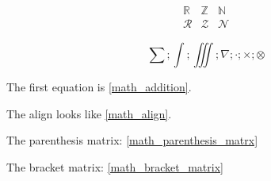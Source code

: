 \begin{equation}
    \begin{array}{ccc}
        \mathbb{R} &\mathbb{Z} &\mathbb{N}\\
        \mathcal{R} &\mathcal{Z} &\mathcal{N}
    \end{array}
\end{equation}

\begin{equation}
    \sum; \int; \iiint; \nabla; \cdot; \times; \otimes
\end{equation}


The first equation is \eqref{math_addition}.


The align looks like \eqref{math_align}.


The parenthesis matrix: \eqref{math_parenthesis_matrx}

The bracket matrix: \eqref{math_bracket_matrix}

